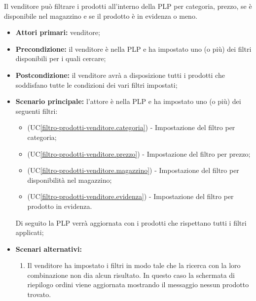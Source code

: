 Il venditore può filtrare i prodotti all'interno della PLP per categoria, prezzo, se è disponibile nel magazzino e se il prodotto è in evidenza o meno.
\begin{itemize}
	\item \textbf{Attori primari:} venditore;
	\item \textbf{Precondizione:} il venditore è nella PLP e ha impostato uno (o più) dei filtri disponibili per i quali cercare;
	\item \textbf{Postcondizione:} il venditore avrà a disposizione tutti i prodotti che soddisfano tutte le condizioni dei vari filtri impostati;
	\item \textbf{Scenario principale:} l'attore è nella PLP e ha impostato uno (o più) dei seguenti filtri:
	\begin{itemize}
		\item (UC\ref{filtro-prodotti-venditore.categoria}) - Impostazione del filtro per categoria;
		\item (UC\ref{filtro-prodotti-venditore.prezzo}) - Impostazione del filtro per prezzo;
		\item (UC\ref{filtro-prodotti-venditore.magazzino}) - Impostazione del filtro per disponibilità nel magazzino;
		\item (UC\ref{filtro-prodotti-venditore.evidenza}) - Impostazione del filtro per prodotto in evidenza.
	\end{itemize}
	Di seguito la PLP verrà aggiornata con i prodotti che rispettano tutti i filtri applicati;
	\item \textbf{Scenari alternativi:}
	\begin{enumerate}[label=\lett]
		\item Il venditore ha impostato i filtri in modo tale che la ricerca con la loro combinazione non dia alcun risultato. In questo caso la schermata di riepilogo ordini viene aggiornata mostrando il messaggio nessun prodotto trovato.
	\end{enumerate}
\end{itemize}

\label{filtro-prodotti-venditore.categoria}

